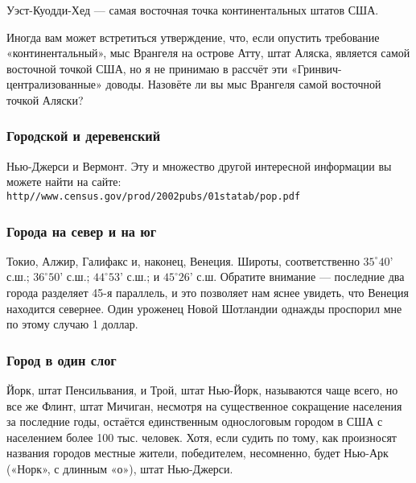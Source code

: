 Уэст-Куодди-Хед %
--- самая восточная точка континентальных штатов США.\heart
                                                                                                                


Иногда вам может встретиться утверждение,  что, если опустить  требование «континентальный», мыс Врангеля %
на острове Атту, %
штат Аляска, является самой восточной точкой США,  но я не принимаю в рассчёт эти «Гринвич-централизованные»  доводы. 
Назовёте ли вы мыс Врангеля самой восточной точкой Аляски?




\subsubsection*{Городской и деревенский}%


Нью-Джерси и Вермонт. Эту и множество другой интересной информации вы можете найти на сайте:\\
\texttt{http//www.census.gov/prod/2002pubs/01statab/pop.pdf} 
 \heart                                                                                                      




\subsubsection*{Города на север и на юг}%


Токио, Алжир, Галифакс и, наконец, Венеция. Широты, соответственно
$35^\circ 40’$ с.ш.;  $36^\circ 50’$ с.ш.; $44^\circ 53’$ с.ш.; и $45^\circ 26’$ с.ш. 
Обратите внимание --- последние два города разделяет 45-я параллель, и это позволяет нам яснее увидеть, что Венеция находится севернее. Один уроженец Новой Шотландии однажды проспорил мне по этому случаю 1 доллар.%
\heart




\subsubsection*{Город в один слог}%


Йорк, штат Пенсильвания, и Трой, штат Нью-Йорк, называются чаще всего, но все же Флинт, штат Мичиган, несмотря на существенное сокращение населения за последние годы, остаётся единственным однослоговым городом в США с населением более 100 тыс. человек.  Хотя, если судить по тому, как произносят названия городов местные жители, победителем, несомненно, будет Нью-Арк («Норк», с длинным «о»),  штат Нью-Джерси. \heart






